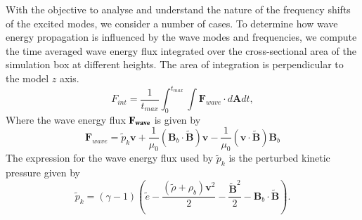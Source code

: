 \documentclass[preprint,authoryear,12pt]{elsarticle}
\begin{document}

With the objective to analyse and understand the nature of the frequency shifts of the excited modes, we consider a number of cases.  To determine how wave energy propagation is influenced by the wave modes and frequencies, we compute the time averaged wave energy flux integrated over the cross-sectional area of the simulation box at different heights. The area of integration is perpendicular to the model $z$ axis.
\begin{equation}
F_{int}= \frac{1}{t_{max}} \int_{0}^{t_{max}} \int {\mathbf F}_{wave} \cdot d{\mathbf A}dt,
\label{e11}
\end{equation}
Where the wave energy flux $\bf{F}_{wave}$ is given by
$$
{\mathbf F}_{wave}=\tilde{p}_{k} {\mathbf v}+\frac{1}{\mu_{0}}\left({\mathbf B}_{b}\cdot \tilde{{\mathbf B}}\right){\mathbf v}-\frac{1}{\mu_{0}}
\left({\mathbf v}\cdot \tilde{\mathbf B}\right){\mathbf B}_{b}
$$
The expression for the wave energy flux used by $\tilde{p}_{k}$ is the perturbed kinetic pressure given by \citet{Bogdan2003}
$$
\tilde{p}_{k}=\left(\gamma - 1\right)\left( \tilde{e}-\frac{ \left( \tilde{\rho} +\rho_b \right){\mathbf v}^2}{2}-\frac{{\tilde {\mathbf B}}^2}{2}-{\mathbf B}_b \cdot  \tilde{\mathbf B}\right).
$$
\end{document}

